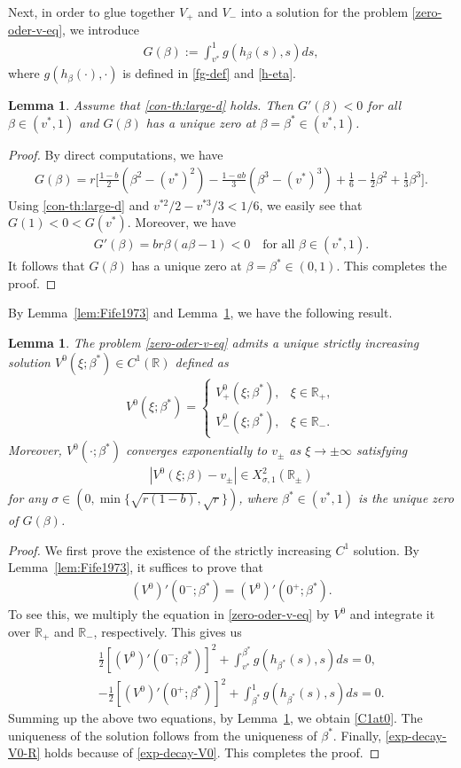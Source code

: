 \documentclass[11pt,a4paper]{article}
\newtheorem{lemma}[theorem]{\textbf{Lemma}}
\numberwithin{equation}{section}
\numberwithin{figure}{section}
\newcommand{\red}[1]{{\color{red}#1}}
\newcommand\bea{\begin{eqnarray}}
\newcommand\eea{\end{eqnarray}}
\newcommand\beaa{\begin{eqnarray*}}
\newcommand\eeaa{\end{eqnarray*}}
\begin{document}
Next, in order to glue together $V_+$ and $V_-$ into a solution for the problem \eqref{zero-oder-v-eq}, we introduce
\bea\label{J-func}
G(\beta):=\int_{v^*}^{1} g(h_{\beta}(s),s)ds,
\eea
where $g(h_{\beta}(\cdot),\cdot)$ is defined in \eqref{fg-def} and \eqref{h-eta}.


\begin{lemma}\label{lem:unique zero for J}
Assume that \eqref{con-th:large-d} holds. Then
$G'(\beta)<0$ for all $\beta\in(v^*,1)$ and
$G(\beta)$ has a unique zero at $\beta=\beta^*\in(v^*,1)$.
\end{lemma}
\begin{proof}
By direct computations, we have
\beaa
G(\beta)=r\Big[\frac{1-b}{2}(\beta^2-(v^*)^2)-\frac{1-ab}{3}(\beta^3-(v^*)^3)+\frac{1}{6}-\frac{1}{2}\beta^2+\frac{1}{3}\beta^3\Big].
\eeaa
Using \eqref{con-th:large-d} and $v^{*2}/2-v^{*3}/3<1/6$, we easily see that
$G(1)<0<G(v^*)$. Moreover, we have
\beaa
G'(\beta)=br\beta(a\beta-1)<0\quad \mbox{for all $\beta\in(v^*,1)$}.
\eeaa
It follows that $G(\beta)$ has a unique zero at $\beta=\beta^*\in(0,1)$. This completes the proof.
\end{proof}

By Lemma~\ref{lem:Fife1973} and Lemma~\ref{lem:unique zero for J}, we have the following result.

\begin{lemma}\label{lem:Fife1973-cor}
The problem \eqref{zero-oder-v-eq} admits a unique strictly increasing solution $V^0(\xi;\beta^*)\in C^1(\mathbb{R})$ defined as
\bea\label{V0}
V^0(\xi;\beta^*)=\begin{cases}
                   V^0_{+}(\xi;\beta^*), & \xi\in\mathbb{R}_+,\\
                   V^0_{-}(\xi;\beta^*), & \xi\in\mathbb{R}_-.
                 \end{cases}
\eea
Moreover, $V^0(\cdot;\beta^*)$ converges exponentially to $v_{\pm}$ as $\xi\to\pm\infty$ satisfying
\bea\label{exp-decay-V0-R}
|V^0(\xi;\beta)-v_{\pm}|\in X^2_{\sigma,1}(\mathbb{R_{\pm}})
\eea
for any $\sigma\in(0,\min\{\sqrt{r(1-b)},\sqrt{r}\})$, where  $\beta^*\in(v^*,1)$ is the unique  zero of $G(\beta)$.
\end{lemma}
\begin{proof}
We first prove the existence of the strictly increasing $C^1$ solution.
By Lemma~\ref{lem:Fife1973}, it suffices to prove that
\bea\label{C1at0}
(V^0)'(0^-;\beta^*)=(V^0)'(0^+;\beta^*).
\eea
To see this, we multiply the equation in \eqref{zero-oder-v-eq} by $V^0$
and integrate it over $\mathbb{R}_+$ and $\mathbb{R}_-$, respectively. This gives us
\beaa
&&\frac{1}{2}[(V^0)'(0^-;\beta^*)]^2+\int_{v^*}^{\beta^*} g(h_{\beta^*}(s),s)ds=0,\\
&&-\frac{1}{2}[(V^0)'(0^+;\beta^*)]^2+\int_{\beta^*}^{1} g(h_{\beta^*}(s),s)ds=0.
\eeaa
Summing up the above two equations, by Lemma~\ref{lem:unique zero for J}, we obtain \eqref{C1at0}.
The uniqueness of the solution follows from the uniqueness of $\beta^*$. Finally, \eqref{exp-decay-V0-R}
holds because of \eqref{exp-decay-V0}. This completes the proof.
\end{proof}
\end{document}
